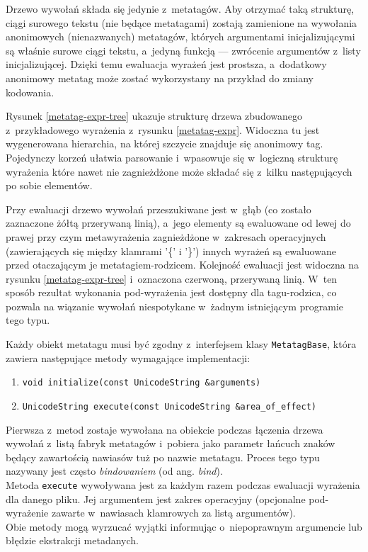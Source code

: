 \par
Drzewo wywołań składa się jedynie z~metatagów. Aby otrzymać taką strukturę, ciągi surowego tekstu (nie będące metatagami) zostają zamienione na wywołania anonimowych (nienazwanych) metatagów, których argumentami inicjalizującymi są właśnie surowe ciągi tekstu, a~jedyną funkcją --- zwrócenie argumentów z~listy inicjalizującej. Dzięki temu ewaluacja wyrażeń jest prostsza, a~dodatkowy anonimowy metatag może zostać wykorzystany na przykład do zmiany kodowania.
\par
Rysunek \ref{metatag-expr-tree} ukazuje strukturę drzewa zbudowanego z~przykładowego wyrażenia z~rysunku \ref{metatag-expr}. Widoczna tu jest wygenerowana hierarchia, na której szczycie znajduje się anonimowy tag. Pojedynczy korzeń ułatwia parsowanie i~wpasowuje się w~logiczną strukturę wyrażenia które nawet nie zagnieżdżone może składać się z~kilku następujących po sobie elementów.
\par
Przy ewaluacji drzewo wywołań przeszukiwane jest w~głąb (co zostało zaznaczone żółtą przerywaną linią), a~jego elementy są ewaluowane od lewej do prawej przy czym metawyrażenia zagnieżdżone w~zakresach operacyjnych (zawierających się między klamrami '\{' i '\}') innych wyrażeń są ewaluowane przed otaczającym je metatagiem-rodzicem. Kolejność ewaluacji jest widoczna na rysunku \ref{metatag-expr-tree} i~oznaczona czerwoną, przerywaną linią. W~ten sposób rezultat wykonania pod-wyrażenia jest dostępny dla tagu-rodzica, co pozwala na wiązanie wywołań niespotykane w~żadnym istniejącym programie tego typu.
\par
Każdy obiekt metatagu musi być zgodny z~interfejsem klasy \texttt{MetatagBase}, która zawiera następujące metody wymagające implementacji:
\begin{enumerate}
\item \texttt{void initialize(const UnicodeString \&arguments)}
\item \texttt{UnicodeString execute(const UnicodeString \&area\_of\_effect)}
\end{enumerate}

Pierwsza z~metod zostaje wywołana na obiekcie podczas łączenia drzewa wywołań z~listą fabryk metatagów i~pobiera jako parametr łańcuch znaków będący zawartością nawiasów tuż po nazwie metatagu. Proces tego typu nazywany jest często \textit{bindowaniem} (od ang. \textit{bind}).\\
Metoda \texttt{execute} wywoływana jest za każdym razem podczas ewaluacji wyrażenia dla danego pliku. Jej argumentem jest zakres operacyjny (opcjonalne pod-wyrażenie zawarte w~nawiasach klamrowych za listą argumentów).\\
Obie metody mogą wyrzucać wyjątki informując o~niepoprawnym argumencie lub błędzie ekstrakcji metadanych.

